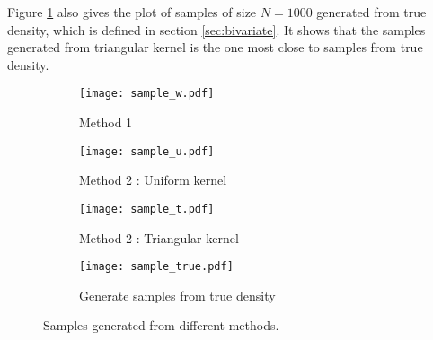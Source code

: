 \documentclass[letterpaper,12pt,hidelinks]{article}
\begin{document}
Figure \ref{plot:sp_m} also gives the plot of samples of size $N = 1000$ generated from true density, which is defined in section \ref{sec:bivariate}. It shows that the samples generated from triangular kernel is the one most close to samples from true density. 



\begin{figure}[htb!]
\centering
\begin{subfigure}{0.45\textwidth}
\texttt{[image: sample\_w.pdf]}
\caption{Method 1}
\end{subfigure}
\begin{subfigure}{0.45\textwidth}
\texttt{[image: sample\_u.pdf]}
\caption{Method 2 : Uniform kernel}
\end{subfigure}
\begin{subfigure}{0.45\textwidth}
\texttt{[image: sample\_t.pdf]}
\caption{Method 2 : Triangular kernel}
\end{subfigure}
\begin{subfigure}{0.45\textwidth}
\texttt{[image: sample\_true.pdf]}
\caption{Generate samples from true density}
\end{subfigure}
\caption{Samples generated from different methods.}
\label{plot:sp_m}
\end{figure}



\newpage




\end{document}
